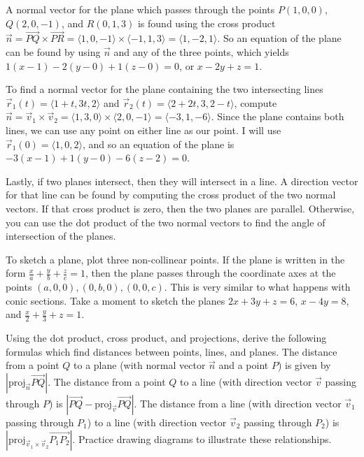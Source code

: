 \begin{example}A normal vector for the plane which passes through the points
$P(1,0,0)$, $Q(2,0,-1)$, and $R(0,1,3)$ is found using the cross product $\vec n
= \vec{PQ}\times \vec{PR} = \langle1,0,-1\rangle\times\langle-1,1,3\rangle =
\langle1,-2,1\rangle$.  So an equation of the plane can be found by
using $\vec n$ and any of the three points, which yields
$1(x-1)-2(y-0)+1(z-0)=0$, or $x-2y+z=1$.
\end{example}

\begin{example}To find a normal vector for the plane containing
the two intersecting lines {$\vec r_1(t) = \langle1+t,3t,2 \rangle$}
and {$\vec r_2(t) = \langle2+2t,3,2-t \rangle$}, compute $\vec n = \vec
v_1\times \vec v_2 = \langle1,3,0\rangle \times \langle2,0,-1\rangle=\langle-3,1,-6
\rangle$. Since the plane contains both lines, we can use any point on
either line as our point.  I will use {$\vec r_1(0) = \langle1,0,2
\rangle$}, and so an equation of the plane is
$-3(x-1)+1(y-0)-6(z-2)=0$.
\end{example}

Lastly, if two planes intersect, then they will intersect in a line. 
A direction vector for that line can be found by computing the cross
product of the two normal vectors.  If that cross product is zero,
then the two planes are parallel. Otherwise, you can use the dot
product of the two normal vectors to find the angle of intersection of
the planes.

To sketch a plane, plot three non-collinear points. If the plane is
written in the form {$\displaystyle\frac xa+\frac yb+\frac zc=1$},
then the plane passes through the coordinate axes at the points
$(a,0,0),(0,b,0),(0,0,c)$. This is very similar to what happens with
conic sections. Take a moment to sketch the planes {$2x+3y+z=6$},
{$x-4y=8$}, and {$\displaystyle\frac x2+\frac y3+z=1$}.

Using the dot product, cross product, and projections, derive the
following formulas which find distances between points, lines, and
planes. The distance from a point $Q$ to a plane (with normal vector
{$\vec n$} and a point $P$) is given by $|\text{proj}_{\vec n}\vec
{PQ}|$.  The distance from a point $Q$ to a line (with direction
vector $\vec v$ passing through $P$) is $|\vec{PQ}-\text{proj}_{\vec
v}\vec {PQ}|$. The distance from a line (with direction vector $\vec
v_1$ passing through $P_1$) to a line (with direction vector $\vec
v_2$ passing through $P_2$) is $|\text{proj}_{\vec v_1\times\vec v_2}\vec
{P_1P_2}|$. Practice drawing diagrams to illustrate these
relationships.


